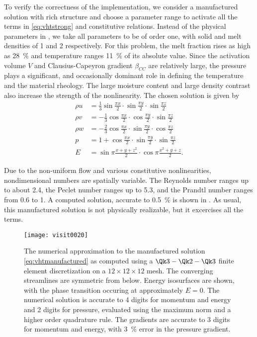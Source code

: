 To verify the correctness of the implementation, we consider a manufactured solution with rich structure and choose a parameter range to activate all the terms in \eqref{eq:vhtstrong} and constitutive relations.
Instead of the physical parameters in , we take all parameters to be of order one, with solid and melt densities of 1 and 2 respectively.
For this problem, the melt fraction rises as high as \SI{28}{\percent} and temperature ranges \SI{11}{\percent} of its absolute value.
Since the activation volume $V$ and Clausius-Capeyron gradient $\beta_{CC}$ are relatively large, the pressure plays a significant, and occasionally dominant role in defining the temperature and the material rheology.
The large moisture content and large density contrast also increase the strength of the nonlinearity.
The chosen solution is given by
\begin{equation}\label{eq:vhtmanufactured}
  \begin{split}
    \rho u & = \frac 1 3 \sin \frac{\pi x}{2} \cdot \sin \frac{\pi y}{2} \cdot \sin \frac{\pi z}{2}  \\
    \rho v & = -\frac 1 3 \cos \frac{\pi x}{2} \cdot \cos \frac{\pi y}{2} \cdot \sin \frac{\pi z}{2} \\
    \rho w & = -\frac 2 3 \cos \frac{\pi x}{2} \cdot \sin \frac{\pi y}{2} \cdot \cos \frac{\pi z}{2} \\
    p      & = 1 + \cos \frac{\pi x}{2} \cdot \sin \frac{\pi y}{2} \cdot \sin \frac{\pi z}{2}        \\
    E & = \sin \pi \frac{x+y+z^2}{2} \cdot \cos \pi \frac{x^2+y+z}{2} .
  \end{split}
\end{equation}

Due to the non-uniform flow and various constitutive nonlinearities, nondimensional numbers are spatially variable.
The Reynolds number ranges up to about \num{2.4}, the Peclet number ranges up to \num{5.3}, and the Prandtl number ranges from \num{0.6} to 1.
A computed solution, accurate to \SI{0.5}{\percent} is shown in .
As usual, this manufactured solution is not physically realizable, but it excercises all the terms.

\begin{figure}
  \centering\texttt{[image: visit0020]}
  \caption{The numerical approximation to the manufactured solution \eqref{eq:vhtmanufactured} as computed using a $\Qk 3 - \Qk 2 - \Qk 3$ finite element discretization on a $12\times 12\times 12$ mesh.
    The converging streamlines are symmetric from below.
    Energy isosurfaces are shown, with the phase transition occuring at approximately $E=0$.
    The numerical solution is accurate to 4 digits for momentum and energy and 2 digits for pressure, evaluated using the maximum norm and a higher order quadrature rule.
    The gradients are accurate to 3 digits for momentum and energy, with \SI{3}{\percent} error in the pressure gradient.}\label{fig:vhtexact}
\end{figure}

